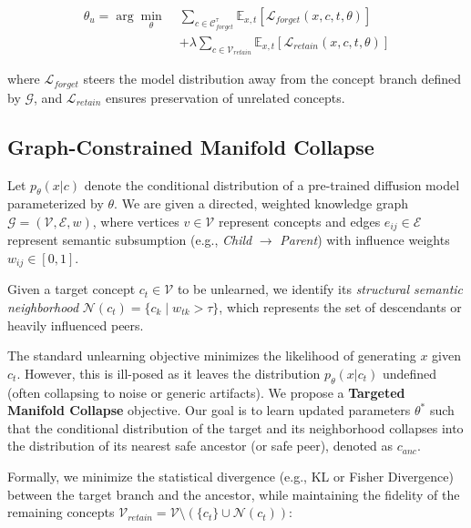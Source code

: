 \begin{equation}
\begin{aligned}
\theta_{u} = \arg\min_{\theta}\;&
\sum_{c \in \mathcal{C}^\tau_{forget}} 
  \mathbb{E}_{x, t} \left[ \mathcal{L}_{forget}(x, c, t, \theta) \right] \\
&+ \lambda \sum_{c \in \mathcal{V}_{retain}} 
  \mathbb{E}_{x, t} \left[ \mathcal{L}_{retain}(x, c, t, \theta) \right]
\end{aligned}
\end{equation}


where $\mathcal{L}_{forget}$ steers the model distribution away from the concept branch defined by $\mathcal{G}$, and $\mathcal{L}_{retain}$ ensures preservation of unrelated concepts.

\subsection{ Graph-Constrained Manifold Collapse}

Let $p_\theta(x|c)$ denote the conditional distribution of a pre-trained diffusion model parameterized by $\theta$. We are given a directed, weighted knowledge graph $\mathcal{G}=(\mathcal{V}, \mathcal{E}, w)$, where vertices $v \in \mathcal{V}$ represent concepts and edges $e_{ij} \in \mathcal{E}$ represent semantic subsumption (e.g., \textit{Child} $\to$ \textit{Parent}) with influence weights $w_{ij} \in [0,1]$.

Given a target concept $c_t \in \mathcal{V}$ to be unlearned, we identify its \textit{structural semantic neighborhood} $\mathcal{N}(c_t) = \{c_k \mid w_{tk} > \tau\}$, which represents the set of descendants or heavily influenced peers.

The standard unlearning objective minimizes the likelihood of generating $x$ given $c_t$. However, this is ill-posed as it leaves the distribution $p_\theta(x|c_t)$ undefined (often collapsing to noise or generic artifacts). We propose a \textbf{Targeted Manifold Collapse} objective. Our goal is to learn updated parameters $\theta^*$ such that the conditional distribution of the target and its neighborhood collapses into the distribution of its nearest safe ancestor (or safe peer), denoted as $c_{anc}$.

Formally, we minimize the statistical divergence (e.g., KL or Fisher Divergence) between the target branch and the ancestor, while maintaining the fidelity of the remaining concepts $\mathcal{V}_{retain} = \mathcal{V} \setminus (\{c_t\} \cup \mathcal{N}(c_t))$:

